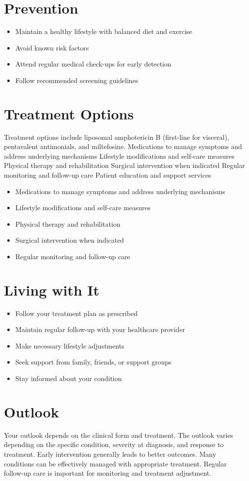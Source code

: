 \section{Prevention}
\begin{itemize}[noitemsep]
  \item Maintain a healthy lifestyle with balanced diet and exercise
  \item Avoid known risk factors
  \item Attend regular medical check-ups for early detection
  \item Follow recommended screening guidelines
\end{itemize}
\section{Treatment Options}
Treatment options include liposomal amphotericin B (first-line for visceral), pentavalent antimonials, and miltefosine. Medications to manage symptoms and address underlying mechanisms Lifestyle modifications and self-care measures Physical therapy and rehabilitation Surgical intervention when indicated Regular monitoring and follow-up care Patient education and support services

\begin{itemize}[noitemsep]
  \item Medications to manage symptoms and address underlying mechanisms
  \item Lifestyle modifications and self-care measures
  \item Physical therapy and rehabilitation
  \item Surgical intervention when indicated
  \item Regular monitoring and follow-up care
\end{itemize}
\section{Living with It}
\begin{itemize}[noitemsep]
  \item Follow your treatment plan as prescribed
  \item Maintain regular follow-up with your healthcare provider
  \item Make necessary lifestyle adjustments
  \item Seek support from family, friends, or support groups
  \item Stay informed about your condition
\end{itemize}
\section{Outlook}
Your outlook depends on the clinical form and treatment. The outlook varies depending on the specific condition, severity at diagnosis, and response to treatment. Early intervention generally leads to better outcomes. Many conditions can be effectively managed with appropriate treatment. Regular follow-up care is important for monitoring and treatment adjustment.
